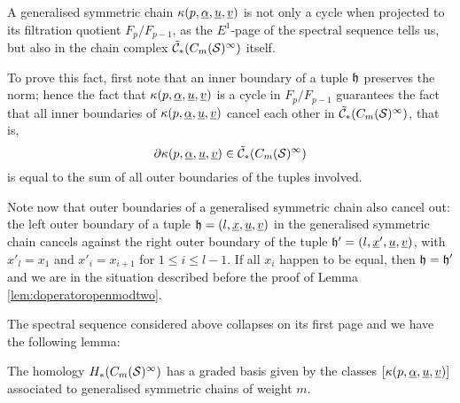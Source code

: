 A generalised symmetric chain $\kappa(p,\underline{\alpha},\underline{u},\underline{v})$
is not only
a cycle when projected to its filtration quotient $F_p/F_{p-1}$, as the $E^1$-page
of the spectral sequence tells us, but also
in the chain complex $\tilde{\mathcal{C}}_*(C_m(\mathcal{S})^{\infty})$ itself.

To prove this fact, first note that an inner boundary of a tuple
$\mathfrak{h}$ preserves the norm; hence the fact that $\kappa(p,\underline{\alpha},\underline{u},\underline{v})$ is a cycle
in $F_p/F_{p-1}$ guarantees the fact that all inner boundaries of $\kappa(p,\underline{\alpha},\underline{u},\underline{v})$
cancel each other in $\tilde{\mathcal{C}}_*(C_m(\mathcal{S})^{\infty})$, that is,
\[
\partial\kappa(p,\underline{\alpha},\underline{u},\underline{v})\in \tilde{\mathcal{C}}_*(C_m(\mathcal{S})^{\infty})
\]
is equal to the sum of all outer boundaries of the tuples involved.

Note now that outer boundaries of a generalised symmetric chain also cancel out:
the left outer boundary
of a tuple $\mathfrak{h}=(l,\underline{x},\underline{u},\underline{v})$ in the generalised symmetric chain cancels against the right outer boundary
of the tuple $\mathfrak{h}'=(l,\underline{x}',\underline{u},\underline{v})$, with $x'_l=x_1$ and $x'_i=x_{i+1}$ for $1\leq i\leq l-1$. If all
$x_i$ happen to be equal, then $\mathfrak{h}=\mathfrak{h}'$ and
we are in the situation described before the proof of Lemma \ref{lem:doperatoropenmodtwo}.

The spectral sequence considered above collapses on its first page and
we have the following lemma:
\begin{lem}
\label{lem:gensymchain}
The homology $H_*(C_m(\mathcal{S})^{\infty})$ has a graded basis given by the classes $[\kappa(p,\underline{\alpha},\underline{u},\underline{v})]$
associated to generalised symmetric chains of weight $m$.
\end{lem}


